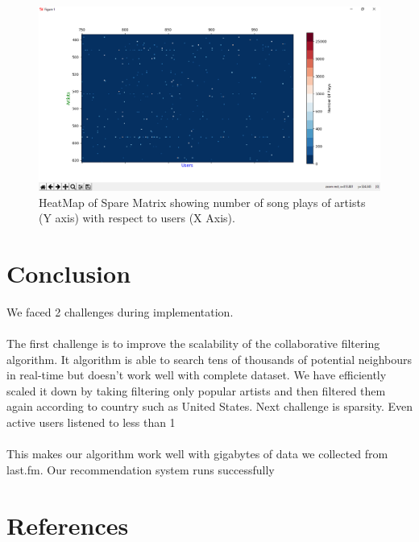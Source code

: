 \documentclass[paper=a4, fontsize=12pt]{scrartcl}
\numberwithin{equation}{section}		%
\numberwithin{figure}{section}			%
\numberwithin{table}{section}				%
\begin{document}
\begin{figure}[H]

\begin{center}

\includegraphics[scale=.5]{graph.png}

 \end{center}

  \caption{HeatMap of Spare Matrix showing number of song plays of artists (Y axis) with respect to users (X Axis).}

  \label{fig:}
\end{figure}  

\pagebreak

\section{Conclusion}

We faced 2 challenges during implementation. 
\\
\\
The first challenge is to improve the scalability of the collaborative filtering algorithm. It algorithm is able to search tens of thousands of potential neighbours in real-time but doesn’t work well with complete dataset. We have efficiently scaled it down by taking filtering only popular artists and then filtered them again according to country such as United States. Next challenge is sparsity. Even active users listened to less than 1%
\\
\\
This makes our algorithm work well with gigabytes of data we collected from last.fm. Our recommendation system runs successfully

\section{References}
\end{document}
